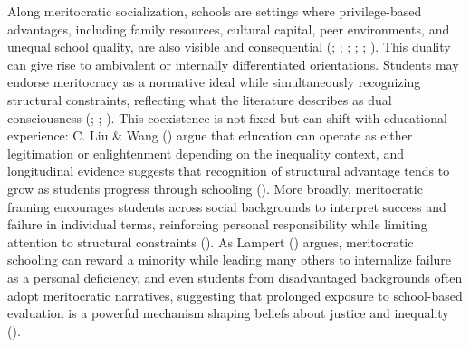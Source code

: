 \documentclass[
  13pt,
]{article}
\begin{document}
Along meritocratic socialization, schools are settings where
privilege-based advantages, including family resources, cultural
capital, peer environments, and unequal school quality, are also visible
and consequential (; ;
;
;
;
). This duality can give
rise to ambivalent or internally differentiated orientations. Students
may endorse meritocracy as a normative ideal while simultaneously
recognizing structural constraints, reflecting what the literature
describes as dual consciousness
(;
;
). This
coexistence is not fixed but can shift with educational experience: C.
Liu \& Wang () argue that education
can operate as either legitimation or enlightenment depending on the
inequality context, and longitudinal evidence suggests that recognition
of structural advantage tends to grow as students progress through
schooling ().
More broadly, meritocratic framing encourages students across social
backgrounds to interpret success and failure in individual terms,
reinforcing personal responsibility while limiting attention to
structural constraints (). As Lampert ()
argues, meritocratic schooling can reward a minority while leading many
others to internalize failure as a personal deficiency, and even
students from disadvantaged backgrounds often adopt meritocratic
narratives, suggesting that prolonged exposure to school-based
evaluation is a powerful mechanism shaping beliefs about justice and
inequality ().
\end{document}
